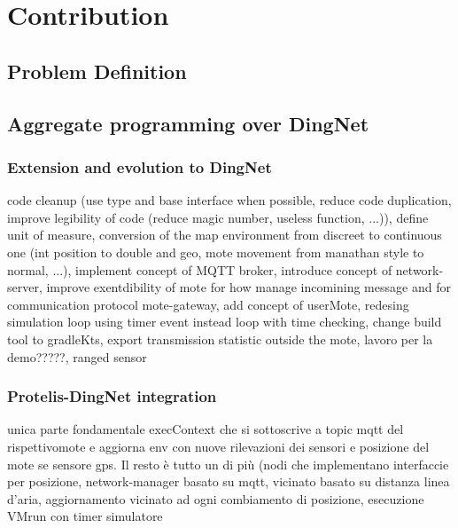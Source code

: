 \chapter{Contribution}
\label{chap:contribution}

\section{Problem Definition}




\section{Aggregate programming over DingNet}
\subsection{Extension and evolution to DingNet}

code cleanup (use type and base interface when possible, reduce code duplication, improve legibility of code (reduce magic number, useless function, ...)), define unit of measure, conversion of the map environment from discreet to continuous one (int position to double and geo, mote movement from manathan style to normal, ...), implement concept of MQTT broker, introduce concept of network-server, improve exentdibility of mote for how manage incomining message and for communication protocol mote-gateway, add concept of userMote, redesing simulation loop using timer event instead loop with time checking, change build tool to gradleKts, export transmission statistic outside the mote, lavoro per la demo?????, ranged sensor


\subsection{Protelis-DingNet integration}

unica parte fondamentale execContext che si sottoscrive a topic mqtt del rispettivomote e aggiorna env con nuove rilevazioni dei sensori e posizione del mote se sensore gps.
Il resto è tutto un di più (nodi che implementano interfaccie per posizione, network-manager basato su mqtt, vicinato basato su distanza linea d'aria, aggiornamento vicinato ad ogni combiamento di posizione, esecuzione VMrun con timer simulatore